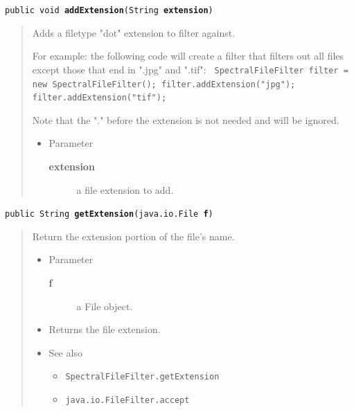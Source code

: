 \documentclass[twoside,11pt]{article}
\renewcommand{\_}{\texttt{\symbol{95}}}
\newcommand{\refdefined}[1]{}
\newcommand{\method}[1]{\texttt{#1}}
\newenvironment{desc}{\begin{quote}}{\end{quote}}
\begin{document}
\method{public void \textbf{addExtension}(\texttt{String} \textbf{extension})\label{l253}\label{l254}}
\begin{desc}Adds a filetype "dot" extension to filter against.

 For example: the following code will create a filter that filters
 out all files except those that end in ".jpg" and ".tif":
 \texttt{
\mbox{}\newline
   SpectralFileFilter filter = new SpectralFileFilter();\mbox{}\newline
   filter.addExtension("jpg");\mbox{}\newline
   filter.addExtension("tif");\mbox{}\newline
 }

 Note that the "." before the extension is not needed and will
 be ignored.
\begin{itemize}
\item{Parameter
  \begin{description}
   \item[\textbf{extension}]{a file extension to add.}
  \end{description}}
\end{itemize}
\end{desc}

\method{public String \textbf{getExtension}(\texttt{java.io.File} \textbf{f})\label{l255}\label{l256}}
\begin{desc}Return the extension portion of the file's name.
\begin{itemize}
\item{Parameter
  \begin{description}
   \item[\textbf{f}]{a File object.}
  \end{description}}
\end{itemize}
\begin{itemize}
\item{Returns the file extension. }
\item{{See also}
  \begin{itemize}
   \item{\texttt{SpectralFileFilter.getExtension} {
\refdefined{l257}}
}
   \item{\texttt{java.io.FileFilter.accept} {
\refdefined{l258}}
}
  \end{itemize}
}
\end{itemize}
\end{desc}

\clearpage
\end{document}

